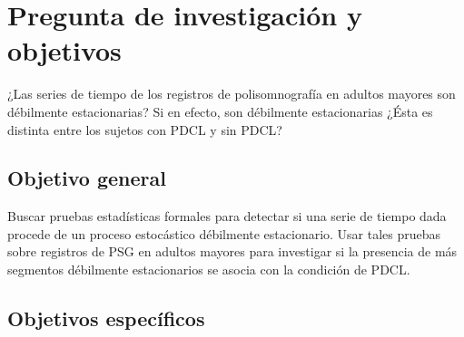 
\section*{Pregunta de investigación y objetivos}

¿Las series de tiempo de los registros de polisomnografía en adultos mayores son débilmente estacionarias?
%
Si en efecto, son débilmente estacionarias ¿Ésta es distinta entre los sujetos con PDCL y sin PDCL?


%


\subsection*{Objetivo general}

Buscar pruebas estadísticas formales para detectar si una serie de tiempo dada procede de un 
proceso estocástico débilmente estacionario.
%
Usar tales pruebas sobre registros de PSG en adultos mayores para investigar si la 
presencia de más segmentos débilmente estacionarios se asocia con la condición de PDCL.


\subsection*{Objetivos específicos}

